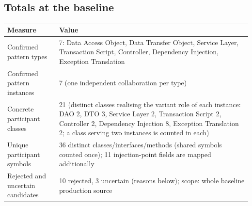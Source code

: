 \documentclass[11pt,a4paper]{article}
\begin{document}
\subsection{Totals at the baseline}
{\small
\begin{center}\begin{tabular}{@{}p{4.3cm}p{11.4cm}@{}}
\toprule \textbf{Measure} & \textbf{Value} \\ \midrule
Confirmed pattern types & 7: Data Access Object, Data Transfer Object, Service Layer, Transaction Script, Controller, Dependency Injection, Exception Translation \\
Confirmed pattern instances & 7 (one independent collaboration per type) \\
Concrete participant classes & 21 (distinct classes realising the variant role of each instance: DAO 2, DTO 3, Service Layer 2, Transaction Script 2, Controller 2, Dependency Injection 8, Exception Translation 2; a class serving two instances is counted in each) \\
Unique participant symbols & 36 distinct classes/interfaces/methods (shared symbols counted once); 11 injection-point fields are mapped additionally \\
Rejected and uncertain candidates & 10 rejected, 3 uncertain (reasons below); scope: whole baseline production source \\
\bottomrule\end{tabular}\end{center}
}
\end{document}
